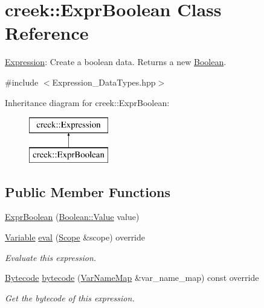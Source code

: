 \hypertarget{classcreek_1_1_expr_boolean}{}\section{creek\+:\+:Expr\+Boolean Class Reference}
\label{classcreek_1_1_expr_boolean}


\hyperlink{classcreek_1_1_expression}{Expression}\+: Create a boolean data. Returns a new {\ttfamily \hyperlink{classcreek_1_1_boolean}{Boolean}}.  




{\ttfamily \#include $<$Expression\+\_\+\+Data\+Types.\+hpp$>$}

Inheritance diagram for creek\+:\+:Expr\+Boolean\+:\begin{figure}[H]
\begin{center}
\leavevmode
\includegraphics[height=2.000000cm]{classcreek_1_1_expr_boolean}
\end{center}
\end{figure}
\subsection*{Public Member Functions}
\begin{DoxyCompactItemize}
\item 
\hyperlink{classcreek_1_1_expr_boolean_aad6d23c99c7d78b2a3e2d296f818becc}{Expr\+Boolean} (\hyperlink{classcreek_1_1_boolean_a7955c007f37b8a29318e49dc8b5bcb13}{Boolean\+::\+Value} value)
\item 
\hyperlink{classcreek_1_1_variable}{Variable} \hyperlink{classcreek_1_1_expr_boolean_a23d54ae588f798e031539bb1e4ea7e47}{eval} (\hyperlink{classcreek_1_1_scope}{Scope} \&scope) override
\begin{DoxyCompactList}\small\item\em Evaluate this expression. \end{DoxyCompactList}\item 
\hyperlink{classcreek_1_1_bytecode}{Bytecode} \hyperlink{classcreek_1_1_expr_boolean_afe0f127b3c5141ec51cfeb3420d8246a}{bytecode} (\hyperlink{classcreek_1_1_var_name_map}{Var\+Name\+Map} \&var\+\_\+name\+\_\+map) const  override\hypertarget{classcreek_1_1_expr_boolean_afe0f127b3c5141ec51cfeb3420d8246a}{}\label{classcreek_1_1_expr_boolean_afe0f127b3c5141ec51cfeb3420d8246a}

\begin{DoxyCompactList}\small\item\em Get the bytecode of this expression. \end{DoxyCompactList}\end{DoxyCompactItemize}


